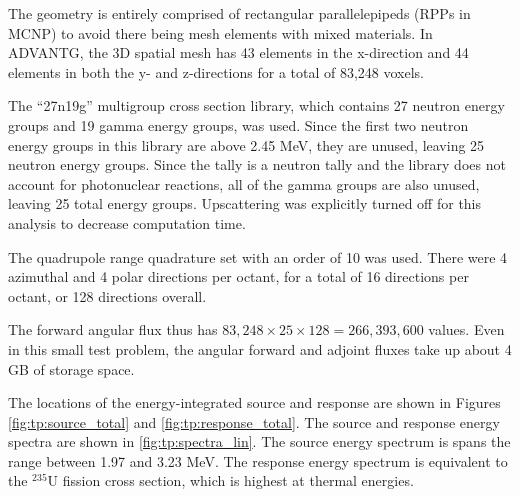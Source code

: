 The geometry is entirely comprised of rectangular parallelepipeds (RPPs in MCNP) to avoid there being mesh elements with mixed materials.
In ADVANTG, the 3D spatial mesh has 43 elements in the x-direction and 44 elements in both the y- and z-directions for a total of 83,248 voxels.

The ``27n19g'' multigroup cross section library, which contains 27 neutron energy groups and 19 gamma energy groups, was used.
Since the first two neutron energy groups in this library are above 2.45 MeV, they are unused, leaving 25 neutron energy groups.
Since the tally is a neutron tally and the library does not account for photonuclear reactions, all of the gamma groups are also unused, leaving 25 total energy groups.
Upscattering was explicitly turned off for this analysis to decrease computation time.

The quadrupole range quadrature set with an order of 10 was used.
There were 4 azimuthal and 4 polar directions per octant, for a total of 16 directions per octant, or 128 directions overall.

The forward angular flux thus has $83,248 \times 25 \times 128 = 266,393,600$ values.
Even in this small test problem, the angular forward and adjoint fluxes take up about 4 GB of storage space.

The locations of the energy-integrated source and response are shown in Figures \ref{fig:tp:source_total} and \ref{fig:tp:response_total}.
The source and response energy spectra are shown in \ref{fig:tp:spectra_lin}.
The source energy spectrum is spans the range between 1.97 and 3.23 MeV.
The response energy spectrum is equivalent to the ${}^{235}\text{U}$ fission cross section, which is highest at thermal energies.

